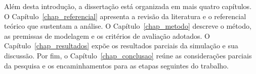 Além desta introdução, a dissertação está organizada em mais quatro capítulos. O Capítulo~\ref{chap_referencial} apresenta a revisão da literatura e o referencial teórico que sustentam a análise. O Capítulo~\ref{chap_metodo} descreve o método, as premissas de modelagem e os critérios de avaliação adotados. O Capítulo~\ref{chap_resultados} expõe os resultados parciais da simulação e sua discussão. Por fim, o Capítulo~\ref{chap_conclusao} reúne as considerações parciais da pesquisa e os encaminhamentos para as etapas seguintes do trabalho.
